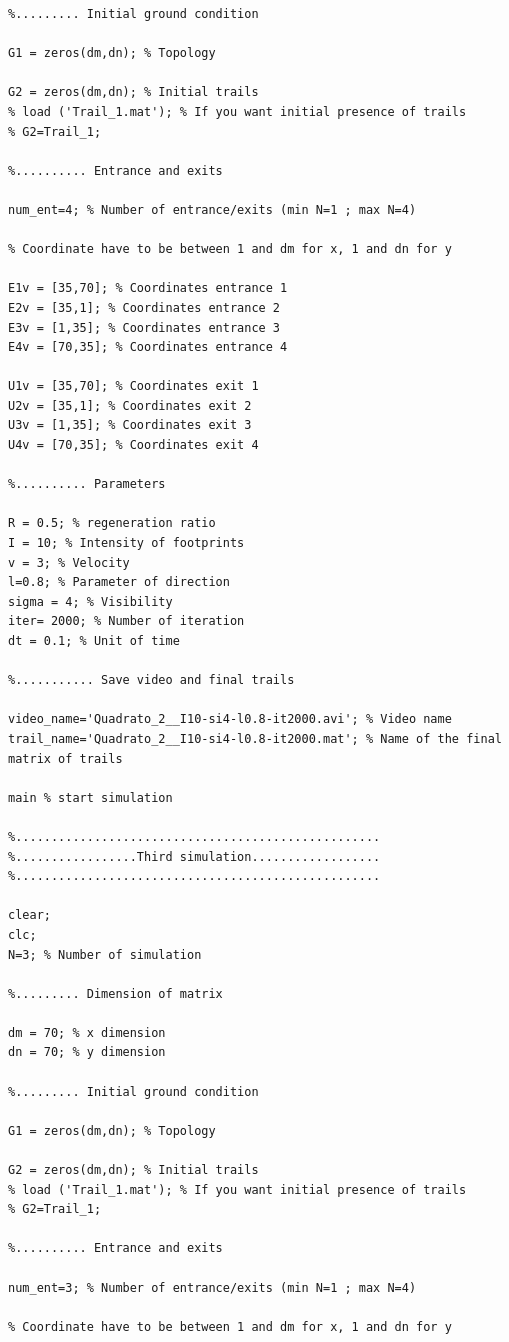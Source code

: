 \documentclass[11pt]{article}
\begin{document}
\begin{lstlisting}
%......... Initial ground condition

G1 = zeros(dm,dn); % Topology

G2 = zeros(dm,dn); % Initial trails
% load ('Trail_1.mat'); % If you want initial presence of trails
% G2=Trail_1;

%.......... Entrance and exits

num_ent=4; % Number of entrance/exits (min N=1 ; max N=4)

% Coordinate have to be between 1 and dm for x, 1 and dn for y

E1v = [35,70]; % Coordinates entrance 1
E2v = [35,1]; % Coordinates entrance 2
E3v = [1,35]; % Coordinates entrance 3
E4v = [70,35]; % Coordinates entrance 4

U1v = [35,70]; % Coordinates exit 1
U2v = [35,1]; % Coordinates exit 2
U3v = [1,35]; % Coordinates exit 3
U4v = [70,35]; % Coordinates exit 4

%.......... Parameters

R = 0.5; % regeneration ratio
I = 10; % Intensity of footprints
v = 3; % Velocity
l=0.8; % Parameter of direction
sigma = 4; % Visibility
iter= 2000; % Number of iteration
dt = 0.1; % Unit of time

%........... Save video and final trails

video_name='Quadrato_2__I10-si4-l0.8-it2000.avi'; % Video name
trail_name='Quadrato_2__I10-si4-l0.8-it2000.mat'; % Name of the final matrix of trails

main % start simulation

%...................................................
%.................Third simulation..................
%...................................................

clear;
clc;
N=3; % Number of simulation

%......... Dimension of matrix

dm = 70; % x dimension
dn = 70; % y dimension

%......... Initial ground condition

G1 = zeros(dm,dn); % Topology

G2 = zeros(dm,dn); % Initial trails
% load ('Trail_1.mat'); % If you want initial presence of trails
% G2=Trail_1;

%.......... Entrance and exits

num_ent=3; % Number of entrance/exits (min N=1 ; max N=4)

% Coordinate have to be between 1 and dm for x, 1 and dn for y


\end{lstlisting}
\end{document}
